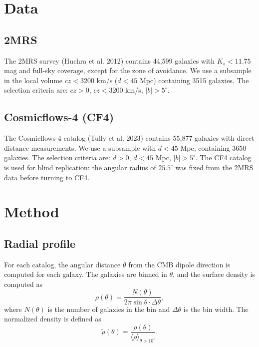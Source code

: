 \documentclass[11pt,a4paper]{article}
\begin{document}
\section{Data}

\subsection{2MRS}

The 2MRS survey (Huchra et al. 2012) contains 44,599 galaxies with
\(K_s < 11.75\) mag and full-sky coverage, except for the zone of avoidance.
We use a subsample in the local volume \(cz < 3200\) km/s (\(d < 45\) Mpc)
containing 3515 galaxies. The selection criteria are: \(cz > 0\),
\(cz < 3200\) km/s, \(|b| > 5^\circ\).

\subsection{Cosmicflows-4 (CF4)}

The Cosmicflows-4 catalog (Tully et al. 2023) contains 55,877 galaxies with
direct distance measurements. We use a subsample with \(d < 45\) Mpc,
containing 3650 galaxies. The selection criteria are: \(d > 0\),
\(d < 45\) Mpc, \(|b| > 5^\circ\). The CF4 catalog is used for blind replication:
the angular radius of \(25.5^\circ\) was fixed from the 2MRS data before
turning to CF4.

\section{Method}

\subsection{Radial profile}

For each catalog, the angular distance \(\theta\) from the CMB dipole direction
is computed for each galaxy. The galaxies are binned in \(\theta\), and the
surface density is computed as
\begin{equation}
\rho(\theta) = \frac{N(\theta)}{2\pi \sin\theta \cdot \Delta\theta},
\end{equation}
where \(N(\theta)\) is the number of galaxies in the bin and \(\Delta\theta\)
is the bin width. The normalized density is defined as
\begin{equation}
\tilde{\rho}(\theta) = \frac{\rho(\theta)}{\langle \rho \rangle_{\theta > 10^\circ}}.
\end{equation}
\end{document}
